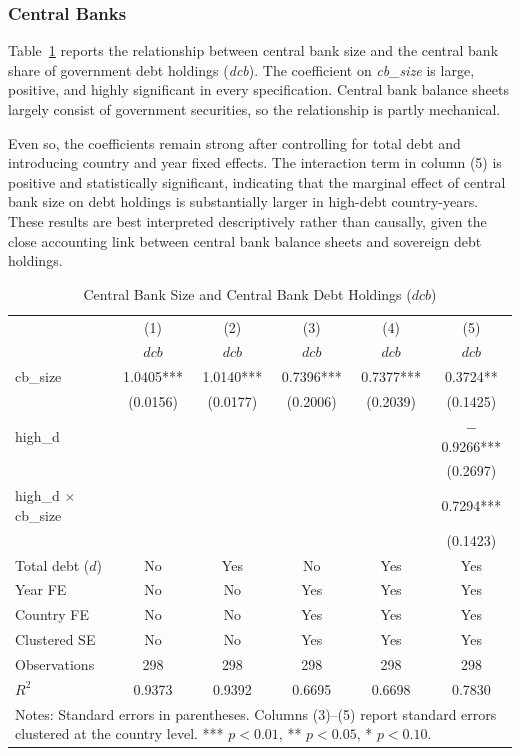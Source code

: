 \documentclass[\latexroot/\projectname]{subfiles}
\begin{document}
\subsubsection{Central Banks}

Table~\ref{tab:cb} reports the relationship between central bank size and the central bank share of government debt holdings (\textit{dcb}). The coefficient on \textit{cb\_size} is large, positive, and highly significant in every specification. Central bank balance sheets largely consist of government securities, so the relationship is partly mechanical.

Even so, the coefficients remain strong after controlling for total debt and introducing country and year fixed effects. The interaction term in column (5) is positive and statistically significant, indicating that the marginal effect of central bank size on debt holdings is substantially larger in high-debt country-years. These results are best interpreted descriptively rather than causally, given the close accounting link between central bank balance sheets and sovereign debt holdings.

\begin{table}[htbp]\centering
\caption{Central Bank Size and Central Bank Debt Holdings ($dcb$)}
\label{tab:cb}
\begin{tabular}{lccccc}
\toprule
 & (1) & (2) & (3) & (4) & (5) \\
 & $dcb$ & $dcb$ & $dcb$ & $dcb$ & $dcb$ \\
\midrule
cb\_size 
& 1.0405*** & 1.0140*** & 0.7396*** & 0.7377*** & 0.3724** \\
& (0.0156) & (0.0177) & (0.2006) & (0.2039) & (0.1425) \\

high\_d
&  &  &  &  & $-$0.9266*** \\
&  &  &  &  & (0.2697) \\

high\_d $\times$ cb\_size
&  &  &  &  & 0.7294*** \\
&  &  &  &  & (0.1423) \\

\midrule
Total debt ($d$) & No & Yes & No & Yes & Yes \\
Year FE          & No & No  & Yes & Yes & Yes \\
Country FE       & No & No  & Yes & Yes & Yes \\
Clustered SE     & No & No  & Yes & Yes & Yes \\

\midrule
Observations & 298 & 298 & 298 & 298 & 298 \\
$R^2$        & 0.9373 & 0.9392 & 0.6695 & 0.6698 & 0.7830 \\
\bottomrule
\multicolumn{6}{p{0.92\linewidth}}{\footnotesize Notes: Standard errors in parentheses. Columns (3)--(5) report standard errors clustered at the country level. *** $p<0.01$, ** $p<0.05$, * $p<0.10$.}
\end{tabular}
\end{table}
\end{document}
